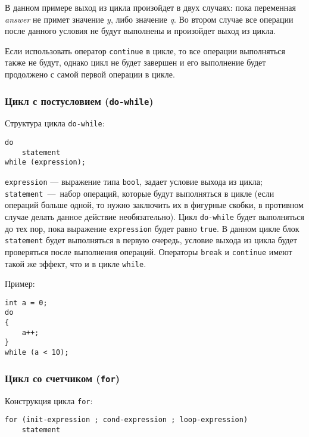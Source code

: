 В данном примере выход из цикла произойдет в двух случаях: пока переменная \textit{answer} не примет значение \textit{y}, либо значение \textit{q}. Во втором случае все операции после данного условия не будут выполнены и произойдет выход из цикла.

Если использовать оператор \lstinline|continue| в цикле, то все операции выполняться также не будут, однако цикл не будет завершен и его выполнение будет продолжено с самой первой операции в цикле.

\subsubsection{Цикл с постусловием (\texttt{do-while})}
Структура цикла \lstinline|do-while|:
\begin{lstlisting}
do
    statement
while (expression);
\end{lstlisting}

\lstinline|expression| --- выражение типа \lstinline|bool|, задает условие выхода из цикла; \lstinline|statement|~---~набор операций, которые будут выполняться в цикле (если операций больше одной, то нужно заключить их в фигурные скобки, в противном случае делать данное действие необязательно). Цикл \lstinline|do-while| будет выполняться до тех пор, пока выражение \lstinline|expression| будет равно \lstinline|true|. В данном цикле блок \lstinline|statement| будет выполняться в первую очередь, условие выхода из цикла будет проверяться после выполнения операций. Операторы \lstinline|break| и \lstinline|continue| имеют такой же эффект, что и в цикле \lstinline|while|.

Пример:
\begin{lstlisting}
int a = 0;
do
{
    a++;
}
while (a < 10);
\end{lstlisting}

\subsubsection{Цикл со счетчиком (\texttt{for})}
Конструкция цикла \lstinline|for|:
\begin{lstlisting}
for (init-expression ; cond-expression ; loop-expression)
    statement
\end{lstlisting}

